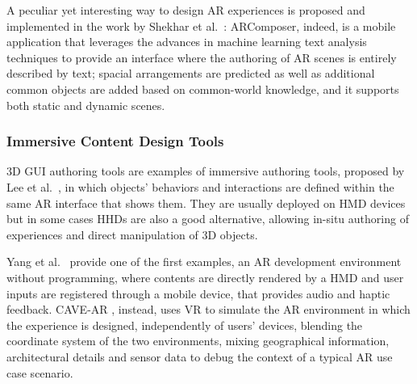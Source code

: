 A peculiar yet interesting way to design AR experiences is proposed and implemented in the work by Shekhar et al.~\cite{shekhar_arcomposer_2019}: ARComposer, indeed, is a mobile application that leverages the advances in machine learning text analysis techniques to provide an interface where the authoring of AR scenes is entirely described by text; spacial arrangements are predicted as well as additional common objects are added based on common-world knowledge, and it supports both static and dynamic scenes.

\subsubsection{Immersive Content Design Tools}
\label{subsec:related-immersice-hcdf}
3D GUI authoring tools are examples of immersive authoring tools, proposed by Lee et al.~\cite{lee2005immersive}, in which objects' behaviors and interactions are defined within the same AR interface that shows them. They are usually deployed on \gls{HMD} devices but in some cases \glspl{HHD} are also a good alternative, allowing in-situ authoring of experiences and direct manipulation of 3D objects.

Yang et al.~\cite{yang_interactive_2016} provide one of the first examples, an AR development environment without programming, where contents are directly rendered by a \gls{HMD} and user inputs are registered through a mobile device, that provides audio and haptic feedback. CAVE-AR \cite{cavallo_cave-ar_2019}, instead, uses VR to simulate the AR environment in which the experience is designed, independently of users' devices, blending the coordinate system of the two environments, mixing geographical information, architectural details and sensor data to debug the context of a typical AR use case scenario.

